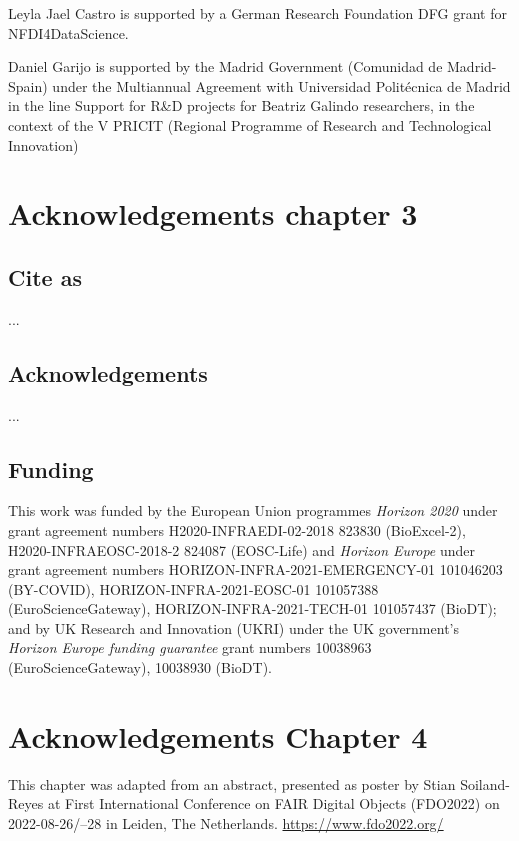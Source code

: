 Leyla Jael Castro is supported by a German Research Foundation DFG grant
for NFDI4DataScience.

Daniel Garijo is supported by the Madrid Government (Comunidad de
Madrid-Spain) under the Multiannual Agreement with Universidad
Politécnica de Madrid in the line Support for R\&D projects for Beatriz
Galindo researchers, in the context of the V PRICIT (Regional Programme
of Research and Technological Innovation)


\section{Acknowledgements chapter 3}

\subsection*{Cite as}

...

\subsection*{Acknowledgements}

...

\subsection*{Funding}

This work was funded by the European Union programmes \emph{Horizon 2020} under grant agreement numbers H2020-INFRAEDI-02-2018 823830 (BioExcel-2), H2020-INFRAEOSC-2018-2 824087 (EOSC-Life) and \emph{Horizon Europe} under grant agreement numbers HORIZON-INFRA-2021-EMERGENCY-01 101046203 (BY-COVID), HORIZON-INFRA-2021-EOSC-01 101057388 (EuroScienceGateway), HORIZON-INFRA-2021-TECH-01 101057437 (BioDT); and by UK Research and Innovation (UKRI) under the UK government’s  \emph{Horizon Europe funding guarantee} grant numbers 10038963 (EuroScienceGateway), 10038930 (BioDT).





\section{Acknowledgements Chapter 4}

This chapter was adapted from an abstract, 
presented as poster by Stian Soiland-Reyes at 
First International Conference on FAIR Digital Objects 
(FDO2022) on
2022-08-26/--28 in Leiden, The Netherlands. 
\url{https://www.fdo2022.org/}

